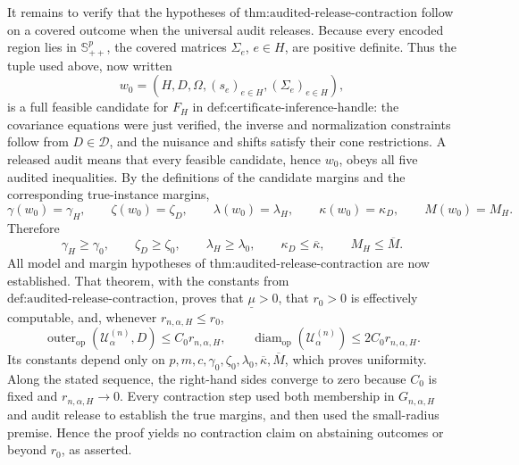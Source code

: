 It remains to verify that the hypotheses of \(\text{thm:audited-release-contraction}\) follow on a covered outcome when the universal audit releases. Because every encoded region lies in \(\mathbb S_{++}^p\), the covered matrices \(\Sigma_e\), \(e\in H\), are positive definite. Thus the tuple used above, now written
\[
w_0=(H,D,\Omega,(s_e)_{e\in H},(\Sigma_e)_{e\in H}),
\]
is a full feasible candidate for \(F_H\) in \(\text{def:certificate-inference-handle}\): the covariance equations were just verified, the inverse and normalization constraints follow from \(D\in\mathcal D\), and the nuisance and shifts satisfy their cone restrictions. A released audit means that every feasible candidate, hence \(w_0\), obeys all five audited inequalities. By the definitions of the candidate margins and the corresponding true-instance margins,
\[
\gamma(w_0)=\gamma_H,
\qquad \zeta(w_0)=\zeta_D,
\qquad \lambda(w_0)=\lambda_H,
\qquad \kappa(w_0)=\kappa_D,
\qquad M(w_0)=M_H.
\]
Therefore
\[
\gamma_H\geq\gamma_0,
\qquad \zeta_D\geq\zeta_0,
\qquad \lambda_H\geq\lambda_0,
\qquad \kappa_D\leq\overline\kappa,
\qquad M_H\leq\overline M.
\]
All model and margin hypotheses of \(\text{thm:audited-release-contraction}\) are now established. That theorem, with the constants from \(\text{def:audited-release-contraction}\), proves that \(\underline\mu>0\), that \(r_0>0\) is effectively computable, and, whenever \(r_{n,\alpha,H}\leq r_0\),
\[
\operatorname{outer}_{\mathrm{op}}(\mathcal U^{(n)}_\alpha,D)
\leq C_0r_{n,\alpha,H},
\qquad
\operatorname{diam}_{\mathrm{op}}(\mathcal U^{(n)}_\alpha)
\leq2C_0r_{n,\alpha,H}.
\]
Its constants depend only on \(p,m,c,\gamma_0,\zeta_0,\lambda_0,\overline\kappa,\overline M\), which proves uniformity. Along the stated sequence, the right-hand sides converge to zero because \(C_0\) is fixed and \(r_{n,\alpha,H}\to0\). Every contraction step used both membership in \(G_{n,\alpha,H}\) and audit release to establish the true margins, and then used the small-radius premise. Hence the proof yields no contraction claim on abstaining outcomes or beyond \(r_0\), as asserted.
